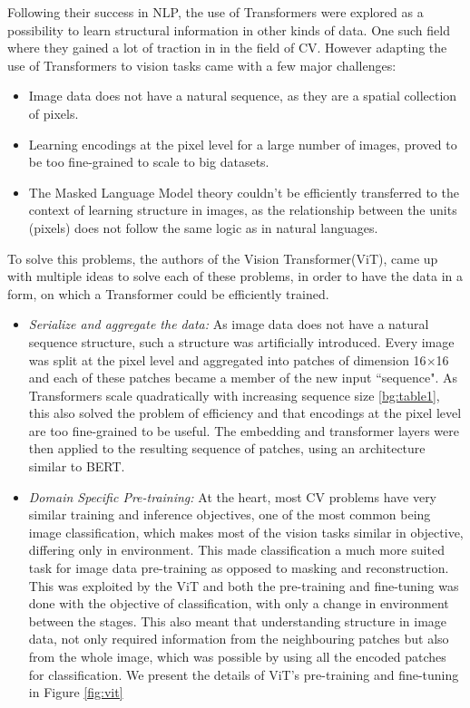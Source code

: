 Following their success in NLP, the use of Transformers were explored as a possibility to learn structural information in other kinds of data. One such field where they gained a lot of traction in in the field of CV.
However adapting the use of Transformers to vision tasks came with a few major challenges: 
\begin{itemize}
\item Image data does not have a natural sequence, as they are a spatial collection of pixels.
\item Learning encodings at the pixel level for a large number of images, proved to be too fine-grained to scale to big datasets.
\item The Masked Language Model theory couldn't be efficiently transferred to the context of learning structure in images, as the relationship between the units (pixels) does not follow the same logic as in natural languages.
\end{itemize}

To solve this problems, the authors of the Vision Transformer(ViT)\cite{dosovitskiyImageWorth16x162021}, came up with multiple ideas to solve each of these problems, in order to have the data in a form, on which a Transformer could be efficiently trained.
\begin{itemize}
\item \emph{Serialize and aggregate the data: } As image data does not have a natural sequence structure, such a structure was artificially introduced. Every image was split at the pixel level and aggregated into patches of dimension 16$\times$16 and each of these patches became a member of the new input ``sequence". As Transformers scale quadratically with increasing sequence size \ref{bg:table1}, this also solved the problem of efficiency and that encodings at the pixel level are too fine-grained to be useful. The embedding and transformer layers were then applied to the resulting sequence of patches, using an architecture similar to BERT.
\item \emph{Domain Specific Pre-training: } At the heart, most CV problems have very similar training and inference objectives, one of the most common being image classification, which makes most of the vision tasks similar in objective, differing only in environment. This made classification a much more suited task for image data pre-training as opposed to masking and reconstruction. This was exploited by the ViT and both the pre-training and fine-tuning was done with the objective of classification, with only a change in environment between the stages. This also meant that understanding structure in image data, not only required information from the neighbouring patches but also from the whole image, which was possible by using all the encoded patches for classification. We present the details of ViT's pre-training and fine-tuning in Figure \ref{fig:vit}
\end{itemize}

